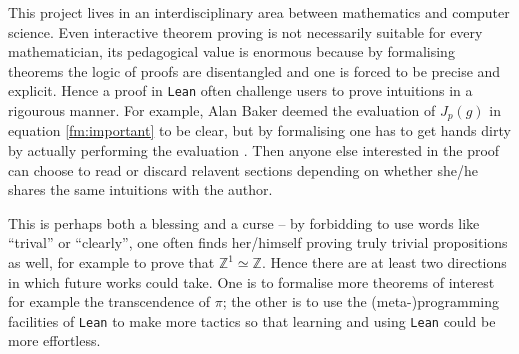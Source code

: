 \documentclass{report}
\theoremstyle{definition}
\begin{document}
This project lives in an interdisciplinary area between mathematics and computer science. Even interactive theorem proving is not necessarily suitable for every mathematician, its pedagogical value is enormous because by formalising theorems the logic of proofs are disentangled and one is forced to be precise and explicit. Hence a proof in {\tt \small Lean} often challenge users to prove intuitions in a rigourous manner. For example, Alan Baker deemed the evaluation of $J_p(g)$ in equation \ref{fm:important} to be clear, but by formalising one has to get hands dirty by actually performing the evaluation \cite{baker1990transcendental}. Then anyone else interested in the proof can choose to read or discard relavent sections depending on whether she/he shares the same intuitions with the author.

This is perhaps both a blessing and a curse -- by forbidding to use words like ``trival'' or ``clearly'', one often finds her/himself proving truly trivial propositions as well, for example to prove that $\mathbb Z^1\simeq \mathbb Z$. Hence there are at least two directions in which future works could take. One is to formalise more theorems of interest for example the transcendence of $\pi$; the other is to use the (meta-)programming facilities of {\tt\small Lean} to make more tactics so that learning and using {\tt\small Lean} could be more effortless.

%


\nocite{*}
\printbibliography[heading=bibintoc]

\end{document}
